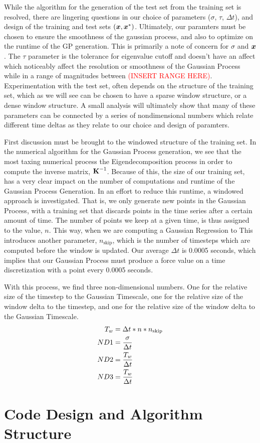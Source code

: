 \documentclass{article}
\begin{document}
While the algorithm for the generation of the test set from the training set is resolved, there are lingering questions in our choice of parameters ($\sigma$, $\tau$, $\Delta t$), and design of the training and test sets $(\boldsymbol{x}, \boldsymbol{x}^*)$. Ultimately, our paramters must be chosen to ensure the smoothness of the gaussian process, and also to optimize on the runtime of the GP generation. This is primarily a note of concern for $\sigma$ and $\boldsymbol{x}$. The $\tau$ parameter is the tolerance for eigenvalue cutoff and doesn't have an affect which noticeably affect the resolution or smoothness of the Gaussian Process while in a range of magnitudes between \textcolor{red}{(INSERT RANGE HERE)}. Experimentation with the test set, often depends on the structure of the training set, which as we will see can be chosen to have a sparse window structure, or a dense window structure. A small analysis will ultimately show that many of these parameters can be connected by a series of nondimensional numbers which relate different time deltas as they relate to our choice and design of paramters. 

First discussion must be brought to the windowed structure of the training set. In the numerical algorithm for the Gaussian Process generation, we see that the most taxing numerical process the Eigendecomposition process in order to compute the inverse matrix, $\boldsymbol{\mathrm{K}}^{-1}$. Because of this, the size of our training set, has a very clear impact on the number of computations and runtime of the Gaussian Process Generation. In an effort to reduce this runtime, a windowed approach is investigated. That is, we only generate new points in the Gaussian Process, with a training set that discards points in the time series after a certain amount of time. The number of points we keep at a given time, is thus assigned to the value, $n$. This way, when we are computing a Gaussian Regression to This introduces another parameter, $n_{\text{skip}}$, which is the number of timesteps which are computed before the window is updated. Our average $\Delta t$ is 0.0005 seconds, which implies that our Gaussian Process must produce a force value on a time discretization with a point every 0.0005 seconds. 

With this process, we find three non-dimensional numbers. One for the relative size of the timestep to the Gaussian Timescale, one for the relative size of the window delta to the timestep, and one for the relative size of the window delta to the Gaussian Timescale.
\begin{align*}
    T_{w} &= \Delta t * n * n_{\text{skip}} \\
    ND1 &= \frac{\sigma}{\Delta t}\\
    ND2 &= \frac{T_w}{\Delta t}\\
    ND3 &= \frac{T_w}{\Delta t}
\end{align*}


\section{Code Design and Algorithm Structure}
\end{document}

